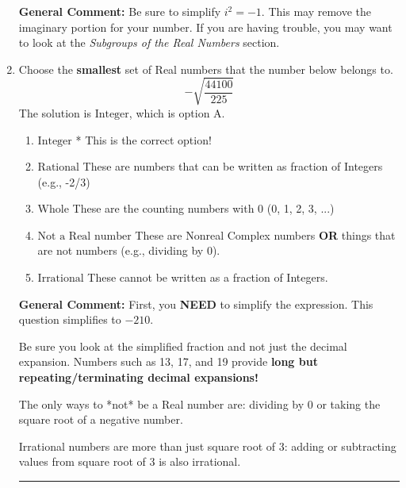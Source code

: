 \documentclass{extbook}[14pt]
\newcommand{\litem}[1]{\item #1

\rule{\textwidth}{0.4pt}}
\begin{document}
\begin{enumerate}
{\textbf{General Comment:} Be sure to simplify $i^2 = -1$. This may remove the imaginary portion for your number. If you are having trouble, you may want to look at the \textit{Subgroups of the Real Numbers} section.
}
\litem{
Choose the \textbf{smallest} set of Real numbers that the number below belongs to.
\[ -\sqrt{\frac{44100}{225}} \]
The solution is \( \text{Integer} \), which is option A.\begin{enumerate}[label=\Alph*.]
\item \( \text{Integer} \)
* This is the correct option!
\item \( \text{Rational} \)
These are numbers that can be written as fraction of Integers (e.g., -2/3)
\item \( \text{Whole} \)
These are the counting numbers with 0 (0, 1, 2, 3, ...)
\item \( \text{Not a Real number} \)
These are Nonreal Complex numbers \textbf{OR} things that are not numbers (e.g., dividing by 0).
\item \( \text{Irrational} \)
These cannot be written as a fraction of Integers.
\end{enumerate}

\textbf{General Comment:} First, you \textbf{NEED} to simplify the expression. This question simplifies to $-210$. 
 
 Be sure you look at the simplified fraction and not just the decimal expansion. Numbers such as 13, 17, and 19 provide \textbf{long but repeating/terminating decimal expansions!} 
 
 The only ways to *not* be a Real number are: dividing by 0 or taking the square root of a negative number. 
 
 Irrational numbers are more than just square root of 3: adding or subtracting values from square root of 3 is also irrational.
}
\end{enumerate}
\end{document}
